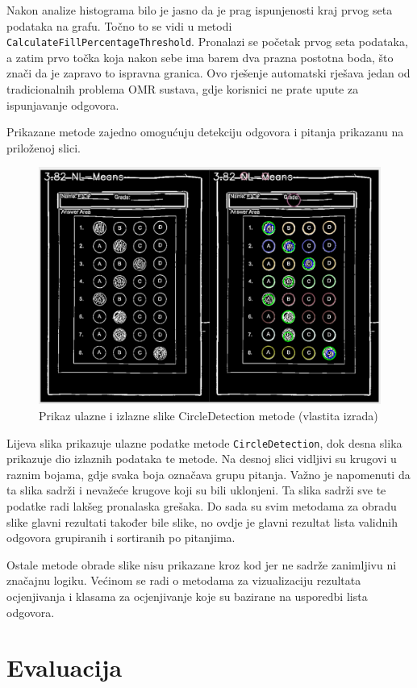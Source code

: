 \documentclass{foi}
\begin{document}
Nakon analize histograma bilo je jasno da je prag ispunjenosti kraj prvog seta podataka na grafu. Točno to se vidi u metodi \texttt{CalculateFillPercentageThreshold}. Pronalazi se početak prvog seta podataka, a zatim prvo točka koja nakon sebe ima barem dva prazna postotna boda, što znači da je zapravo to ispravna granica. Ovo rješenje automatski rješava jedan od tradicionalnih problema OMR sustava, gdje korisnici ne prate upute za ispunjavanje odgovora.

Prikazane metode zajedno omogućuju detekciju odgovora i pitanja prikazanu na priloženoj slici.

\begin{figure}[H]
\centering
\includegraphics[width=0.8\linewidth]{slike/CircleDetectionComp.png}
\caption{Prikaz ulazne i izlazne slike CircleDetection metode (vlastita izrada)}
\end{figure}

Lijeva slika prikazuje ulazne podatke metode \texttt{CircleDetection}, dok desna slika prikazuje dio izlaznih podataka te metode. Na desnoj slici vidljivi su krugovi u raznim bojama, gdje svaka boja označava grupu pitanja. Važno je napomenuti da ta slika sadrži i nevažeće krugove koji su bili uklonjeni. Ta slika sadrži sve te podatke radi lakšeg pronalaska grešaka. Do sada su svim metodama za obradu slike glavni rezultati također bile slike, no ovdje je glavni rezultat lista validnih odgovora grupiranih i sortiranih po pitanjima.

Ostale metode obrade slike nisu prikazane kroz kod jer ne sadrže zanimljivu ni značajnu logiku. Većinom se radi o metodama za vizualizaciju rezultata ocjenjivanja i klasama za ocjenjivanje koje su bazirane na usporedbi lista odgovora.

\chapter{Evaluacija}
\end{document}
